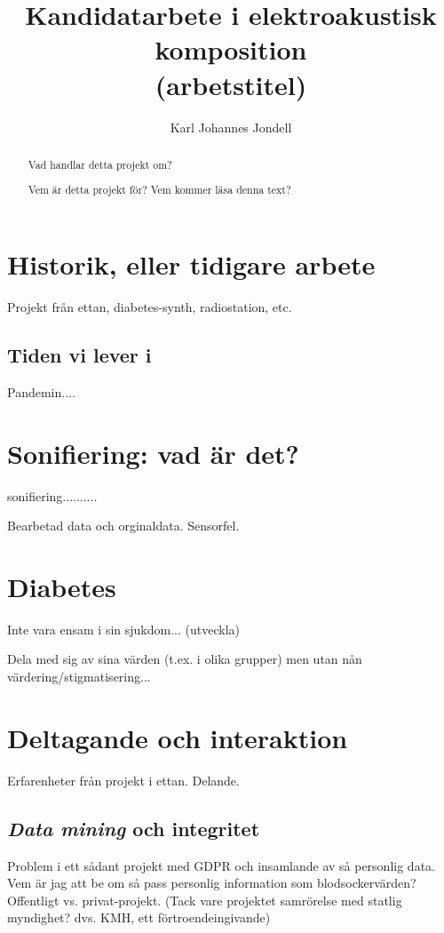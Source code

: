 \documentclass[12pt]{article}
\begin{document}
\title{Kandidatarbete i elektroakustisk komposition\\(arbetstitel)}
\author{Karl Johannes Jondell}

\maketitle

\begin{abstract}
Vad handlar detta projekt om?

Vem är detta projekt för? Vem kommer läsa denna text? 
\end{abstract}

\tableofcontents

\section{Historik, eller tidigare arbete}
Projekt från ettan, diabetes-synth, radiostation, etc.
\subsection{Tiden vi lever i}
Pandemin....

\section{Sonifiering: vad är det?}
sonifiering.......... \cite{bijsterveld_sonic_2019}

Bearbetad data och orginaldata. Sensorfel.

\section{Diabetes}
Inte vara ensam i sin sjukdom... (utveckla)

Dela med sig av sina värden (t.ex. i olika grupper) men utan nån värdering/stigmatisering...

\section{Deltagande och interaktion}
Erfarenheter från projekt i ettan. Delande.

\subsection{\emph{Data mining} och integritet}
Problem i ett sådant projekt med GDPR och insamlande av så personlig data. Vem är jag att be om så pass personlig information som blodsockervärden? Offentligt vs. privat-projekt. (Tack vare projektet samrörelse med statlig myndighet? dvs. KMH, ett förtroendeingivande)
\end{document}
